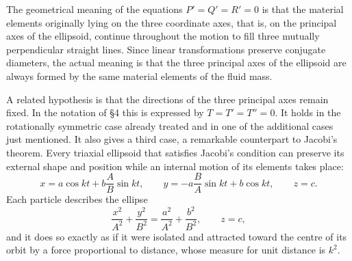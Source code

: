 \documentclass[11pt]{article}
\begin{document}
The geometrical meaning of the equations \(P'=Q'=R'=0\) is that the material elements originally lying on the three coordinate axes, that is, on the principal axes of the ellipsoid, continue throughout the motion to fill three mutually perpendicular straight lines.  Since linear transformations preserve conjugate diameters, the actual meaning is that the three principal axes of the ellipsoid are always formed by the same material elements of the fluid mass.

A related hypothesis is that the directions of the three principal axes remain fixed.  In the notation of \S4 this is expressed by \(T=T'=T''=0\).  It holds in the rotationally symmetric case already treated and in one of the additional cases just mentioned.  It also gives a third case, a remarkable counterpart to Jacobi's theorem.  Every triaxial ellipsoid that satisfies Jacobi's condition can preserve its external shape and position while an internal motion of its elements takes place:
\begin{equation}
 x=a\cos kt+b\frac{A}{B}\sin kt,
 \qquad
 y=-a\frac{B}{A}\sin kt+b\cos kt,
 \qquad
 z=c.
\end{equation}
Each particle describes the ellipse
\[
 \frac{x^2}{A^2}+\frac{y^2}{B^2}=\frac{a^2}{A^2}+\frac{b^2}{B^2},\qquad z=c,
\]
and it does so exactly as if it were isolated and attracted toward the centre of its orbit by a force proportional to distance, whose measure for unit distance is \(k^2\).
\end{document}
